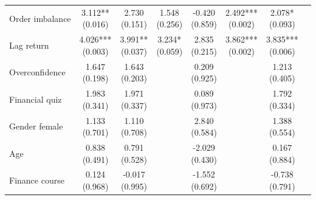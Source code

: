 \begin{threeparttable}
\begin{tabular}{lccccccc}
Order imbalance & \makecell{3.112** \\ (0.016) } & \makecell{2.730 \\ (0.151) } & \makecell{1.548 \\ (0.256) } & \makecell{-0.420 \\ (0.859) } & \makecell{2.492*** \\ (0.002) } & \makecell{2.078* \\ (0.093) } \\
Lag return & \makecell{4.026*** \\ (0.003) } & \makecell{3.991** \\ (0.037) } & \makecell{3.234* \\ (0.059) } & \makecell{2.835 \\ (0.215) } & \makecell{3.862*** \\ (0.002) } & \makecell{3.835*** \\ (0.006) } \\
Overconfidence & \makecell{1.647 \\ (0.198) } & \makecell{1.643 \\ (0.203) } &  & \makecell{0.209 \\ (0.925) } &  & \makecell{1.213 \\ (0.405) } \\
Financial quiz & \makecell{1.983 \\ (0.341) } & \makecell{1.971 \\ (0.337) } &  & \makecell{0.089 \\ (0.973) } &  & \makecell{1.792 \\ (0.334) } \\
Gender female & \makecell{1.133 \\ (0.701) } & \makecell{1.110 \\ (0.708) } &  & \makecell{2.840 \\ (0.584) } &  & \makecell{1.388 \\ (0.554) } \\
Age & \makecell{0.838 \\ (0.491) } & \makecell{0.791 \\ (0.528) } &  & \makecell{-2.029 \\ (0.430) } &  & \makecell{0.167 \\ (0.884) } \\
Finance course & \makecell{0.124 \\ (0.968) } & \makecell{-0.017 \\ (0.995) } &  & \makecell{-1.552 \\ (0.692) } &  & \makecell{-0.738 \\ (0.791) } \\

\end{tabular}
\end{threeparttable}
